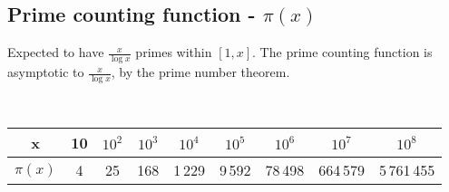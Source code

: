 \subsection{Prime counting function - \texorpdfstring{$\pi(x)$}{}}

Expected to have $ \frac{x}{\log{x}} $ primes within $[1, x]$. The prime counting function is asymptotic to $\frac{x}{\log x}$, by the prime number theorem.

\ 

\begin{tabular}{|c|c|c|c|c|c|c|c|c|}
\hline
  \cellcolor{gray!40} x&10&$10^2$&$10^3$&$10^4$&$10^5$&$10^6$&$10^7$&$10^8$\\ \hline
  \cellcolor{gray!40} $\pi(x)$& 4 & 25 & 168 & 1\,229 & 9\,592 & 78\,498 & 664\,579 & 5\,761\,455\\ \hline
\end{tabular}

\ 